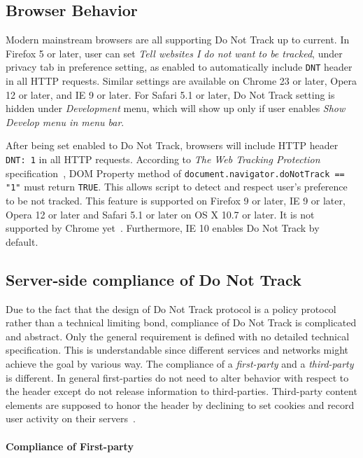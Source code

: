 \documentclass{sig-alternate}
\begin{document}
\subsection*{Browser Behavior} \label{sec:browserbehavior}

Modern mainstream browsers are all supporting Do Not Track up to current. In Firefox 5 or later, user can set \emph{Tell websites I do not want to be tracked}, under privacy tab in preference setting, as enabled to automatically include \texttt{DNT} header in all HTTP requests. Similar settings are available on Chrome 23 or later, Opera 12 or later, and IE 9 or later. For Safari 5.1 or later, Do Not Track setting is hidden under \emph{Development} menu, which will show up only if user enables \emph{Show Develop menu in menu bar}.

After being set enabled to Do Not Track, browsers will include HTTP header \verb|DNT: 1| in all HTTP requests. According to \emph{The Web Tracking Protection} specification~\cite{w3cwtp}, DOM Property method of \verb|document.navigator.doNotTrack == "1"| must return \verb|TRUE|. This allows script to detect and respect user's preference to be not tracked. This feature is supported on Firefox 9 or later, IE 9 or later, Opera 12 or later and Safari 5.1 or later on OS X 10.7 or later. It is not supported by Chrome yet~\cite{navigatordnt}. Furthermore, IE 10 enables Do Not Track by default.~\cite{wikidnt}

\subsection*{Server-side compliance of Do Not Track}

Due to the fact that the design of Do Not Track protocol is a policy protocol rather than a technical limiting bond, compliance of Do Not Track is complicated and abstract. Only the general requirement is defined with no detailed technical specification. This is understandable since different services and networks might achieve the goal by various way. The compliance of a \emph{first-party} and a \emph{third-party} is different. In general first-parties do not need to alter behavior with respect to the header except do not release information to third-parties. Third-party content elements are supposed to honor the header by declining to set cookies and record user activity on their servers~\cite{donotbeg}.

\paragraph{Compliance of First-party}
\end{document}
